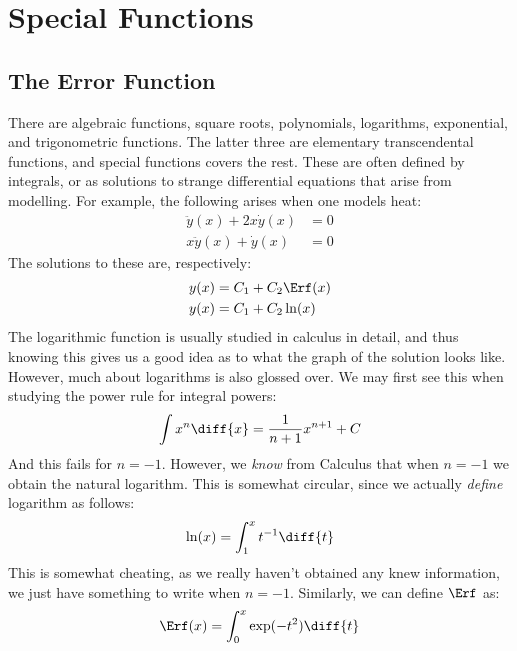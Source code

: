\chapter{Special Functions}
    \section{The Error Function}
        There are algebraic functions, square roots, polynomials,
        logarithms, exponential, and trigonometric functions.
        The latter three are elementary transcendental functions,
        and special functions covers the rest. These are often
        defined by integrals, or as solutions to strange
        differential equations that arise from modelling. For
        example, the following arises when one models heat:
        \begin{align}
            \ddot{y}(x)+2x\dot{y}(x)&=0\\
            x\ddot{y}(x)+\dot{y}(x)&=0
        \end{align}
        The solutions to these are, respectively:
        \begin{align}
            y(x)&=C_{1}+C_{2}\Erf(x)\\
            y(x)&=C_{1}+C_{2}\ln(x)
        \end{align}
        The logarithmic function is usually studied in
        calculus in detail, and thus knowing this gives us a
        good idea as to what the graph of the solution looks like.
        However, much about logarithms is also glossed over.
        We may first see this when studying the power rule for
        integral powers:
        \begin{equation}
            \int{x}^{n}\diff{x}=\frac{1}{n+1}x^{n+1}+C
        \end{equation}
        And this fails for $n=-1$. However, we \textit{know}
        from Calculus that when $n=-1$ we obtain the natural
        logarithm. This is somewhat circular, since we actually
        \textit{define} logarithm as follows:
        \begin{equation}
            \ln(x)=\int_{1}^{x}t^{-1}\diff{t}
        \end{equation}
        This is somewhat cheating, as we really haven't obtained
        any knew information, we just have something to write
        when $n=-1$. Similarly, we can define $\Erf$ as:
        \begin{equation}
            \Erf(x)=\int_{0}^{x}\exp(-t^{2})\diff{t}
        \end{equation}

